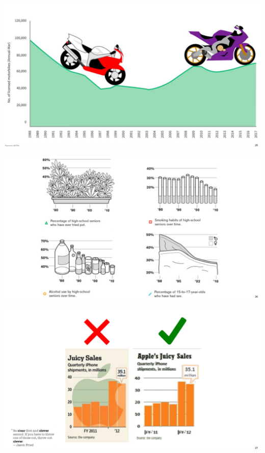 \documentclass[
  ignorenonframetext,
]{beamer}
\begin{document}
\begin{frame}{}
\protect\hypertarget{section-16}{}
\includegraphics{hallofshame_figs/fig_25.png}
\end{frame}

\begin{frame}{}
\protect\hypertarget{section-17}{}
\includegraphics{hallofshame_figs/fig_26.png}
\end{frame}

\begin{frame}{}
\protect\hypertarget{section-18}{}
\includegraphics{hallofshame_figs/fig_27.png}
\end{frame}
\end{document}
